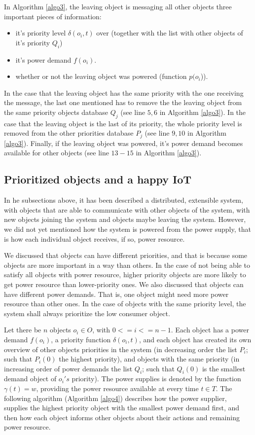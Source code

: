 \documentclass[letterpaper, 10 pt, conference]{ieeeconf}
\begin{document}
In Algorithm \ref{algo3}, the leaving object is messaging all other objects three important pieces of information:
 \begin{itemize}
   \item it's priority level $\delta(o_{i}, t)$ over (together with the list with other objects of it's priority $Q_{i}$)
   \item it's power demand $f(o_{i})$.
   \item whether or not the leaving object was powered (function $p(o_{i}$)).
 \end{itemize}

In the case that the leaving object has the same priority with the one receiving the message, the last one mentioned has to remove the the leaving object from the same priority objects database $Q_{j}$ (see line $5, 6$ in Algorithm \ref{algo3}). In the case that the leaving object is the last of its priority, the whole priority level is removed from the other priorities database $P_{j}$ (see line $9, 10$ in Algorithm \ref{algo3}). Finally, if the leaving object was powered, it's power demand becomes available for other objects (see line $13-15$ in Algorithm \ref{algo3}).

\subsection{Prioritized objects and a happy IoT}

In he subsections above, it has been described a distributed, extensible system, with objects that are able to communicate with other objects of the system, with new objects joining the system and objects maybe leaving the system. However, we did not yet mentioned how the system is powered from the power supply, that is how each individual object receives, if so, power resource.

We discussed that objects can have different priorities, and that is because some objects are more important in a way than others. In the case of not being able to satisfy all objects with power resource, higher priority objects are more likely to get power resource than lower-priority ones. We also discussed that objects can have different power demands. That is, one object might need more power resource than other ones. In the case of objects with the same priority level, the system shall always prioritize the low consumer object.

Let there be $n$ objects $o_{i}\in O$, with $0<=i<=n-1$. Each object has a power demand $f(o_{i})$, a priority function $\delta(o_{i}, t)$, and each object has created its own overview of other objects priorities in the system (in decreasing order the list $P_{i}$; such that $P_{i}(0)$ the highest priority), and objects with the same priority (in increasing order of power demands the list $Q_{i}$; such that $Q_{i}(0)$ is the smallest demand object of $o_{i}'s$ priority). The power supplies is denoted by the function $\gamma(t) = w$, providing the power resource available at every time $t \in T$. The following algorithm (Algorithm \ref{algo4}) describes how the power supplier, supplies the highest priority object with the smallest power demand first, and then how each object informs other objects about their actions and remaining power resource.
\end{document}
